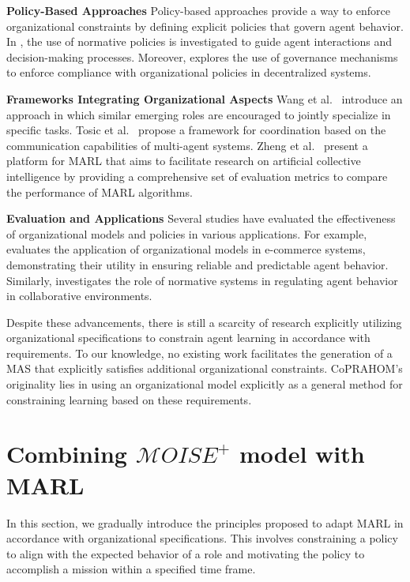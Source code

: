 \documentclass[conference]{IEEEtran}
\begin{document}
\textbf{Policy-Based Approaches} \quad
Policy-based approaches provide a way to enforce organizational constraints by defining explicit policies that govern agent behavior. In \cite{krupanski2015norm}, the use of normative policies is investigated to guide agent interactions and decision-making processes. Moreover, \cite{vos2020governing} explores the use of governance mechanisms to enforce compliance with organizational policies in decentralized systems.

\textbf{Frameworks Integrating Organizational Aspects} \quad
Wang et al.~\cite{Wang2020} introduce an approach in which similar emerging roles are encouraged to jointly specialize in specific tasks. Tosic et al.~\cite{Tosic2010} propose a framework for coordination based on the communication capabilities of multi-agent systems. Zheng et al.~\cite{Zheng2018} present a platform for MARL that aims to facilitate research on artificial collective intelligence by providing a comprehensive set of evaluation metrics to compare the performance of MARL algorithms.

\textbf{Evaluation and Applications} \quad
Several studies have evaluated the effectiveness of organizational models and policies in various applications. For example, \cite{dignum2004agent} evaluates the application of organizational models in e-commerce systems, demonstrating their utility in ensuring reliable and predictable agent behavior. Similarly, \cite{andrighetto2013normative} investigates the role of normative systems in regulating agent behavior in collaborative environments.

Despite these advancements, there is still a scarcity of research explicitly utilizing organizational specifications to constrain agent learning in accordance with requirements. To our knowledge, no existing work facilitates the generation of a MAS that explicitly satisfies additional organizational constraints. CoPRAHOM's originality lies in using an organizational model explicitly as a general method for constraining learning based on these requirements.


\section{Combining $\mathcal{M}OISE^+$ model with MARL}\label{sec:linking_marl_moise}
\label{sec:marl_moise_linking}

In this section, we gradually introduce the principles proposed to adapt MARL in accordance with organizational specifications. This involves constraining a policy to align with the expected behavior of a role and motivating the policy to accomplish a mission within a specified time frame.
\end{document}
